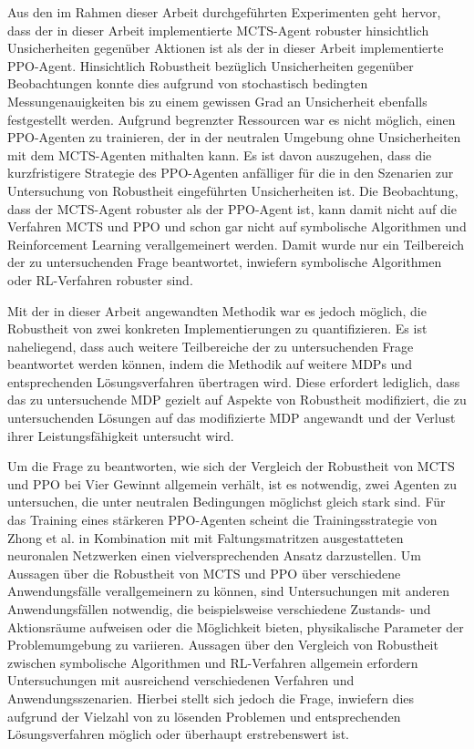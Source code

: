 Aus den im Rahmen dieser Arbeit durchgeführten Experimenten geht hervor, dass der in dieser Arbeit implementierte MCTS-Agent robuster hinsichtlich Unsicherheiten gegenüber Aktionen ist als der in dieser Arbeit implementierte PPO-Agent. Hinsichtlich Robustheit bezüglich Unsicherheiten gegenüber Beobachtungen konnte dies aufgrund von stochastisch bedingten Messungenauigkeiten bis zu einem gewissen Grad an Unsicherheit ebenfalls festgestellt werden. Aufgrund begrenzter Ressourcen war es nicht möglich, einen PPO-Agenten zu trainieren, der in der neutralen Umgebung ohne Unsicherheiten mit dem MCTS-Agenten mithalten kann. Es ist davon auszugehen, dass die kurzfristigere Strategie des PPO-Agenten anfälliger für die in den Szenarien zur Untersuchung von Robustheit eingeführten Unsicherheiten ist. Die Beobachtung, dass der MCTS-Agent robuster als der PPO-Agent ist, kann damit nicht auf die Verfahren MCTS und PPO und schon gar nicht auf symbolische Algorithmen und Reinforcement Learning verallgemeinert werden. Damit wurde nur ein Teilbereich der zu untersuchenden Frage beantwortet, inwiefern symbolische Algorithmen oder RL-Verfahren robuster sind.

Mit der in dieser Arbeit angewandten Methodik war es jedoch möglich, die Robustheit von zwei konkreten Implementierungen zu quantifizieren. Es ist naheliegend, dass auch weitere Teilbereiche der zu untersuchenden Frage beantwortet werden können, indem die Methodik auf weitere MDPs und entsprechenden Lösungsverfahren übertragen wird. Diese erfordert lediglich, dass das zu untersuchende MDP gezielt auf Aspekte von Robustheit modifiziert, die zu untersuchenden Lösungen auf das modifizierte MDP angewandt und der Verlust ihrer Leistungsfähigkeit untersucht wird.

Um die Frage zu beantworten, wie sich der Vergleich der Robustheit von MCTS und PPO bei Vier Gewinnt allgemein verhält, ist es notwendig, zwei Agenten zu untersuchen, die unter neutralen Bedingungen möglichst gleich stark sind. Für das Training eines stärkeren PPO-Agenten scheint die Trainingsstrategie von Zhong et al. in Kombination mit mit Faltungsmatritzen ausgestatteten neuronalen Netzwerken einen vielversprechenden Ansatz darzustellen. Um Aussagen über die Robustheit von MCTS und PPO über verschiedene Anwendungsfälle verallgemeinern zu können, sind Untersuchungen mit anderen Anwendungsfällen notwendig, die beispielsweise verschiedene Zustands- und Aktionsräume aufweisen oder die Möglichkeit bieten, physikalische Parameter der Problemumgebung zu variieren. Aussagen über den Vergleich von Robustheit zwischen symbolische Algorithmen und RL-Verfahren allgemein erfordern Untersuchungen mit ausreichend verschiedenen Verfahren und Anwendungsszenarien. Hierbei stellt sich jedoch die Frage, inwiefern dies aufgrund der Vielzahl von zu lösenden Problemen und entsprechenden Lösungsverfahren möglich oder überhaupt erstrebenswert ist.
